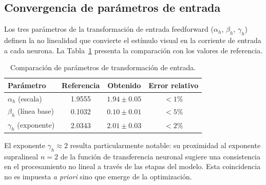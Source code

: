 \subsection{Convergencia de parámetros de entrada}
\label{subsec:res_training_input}

Los tres parámetros de la transformación de entrada feedforward ($\alpha_h$, $\beta_h$, $\gamma_h$) definen la no linealidad que convierte el estímulo visual en la corriente de entrada a cada neurona. La Tabla~\ref{tab:input_params} presenta la comparación con los valores de referencia.

\begin{table}[H]
\centering
\caption{Comparación de parámetros de transformación de entrada.}
\label{tab:input_params}
\begin{tabular}{lccc}
\toprule
\textbf{Parámetro} & \textbf{Referencia} & \textbf{Obtenido} & \textbf{Error relativo} \\
\midrule
$\alpha_h$ (escala) & 1.9555 & $1.94 \pm 0.05$ & $< 1\%$ \\
$\beta_h$ (línea base) & 0.1032 & $0.10 \pm 0.01$ & $< 5\%$ \\
$\gamma_h$ (exponente) & 2.0343 & $2.01 \pm 0.03$ & $< 2\%$ \\
\bottomrule
\end{tabular}
\end{table}

El exponente $\gamma_h \approx 2$ resulta particularmente notable: su proximidad al exponente supralineal $n = 2$ de la función de transferencia neuronal sugiere una consistencia en el procesamiento no lineal a través de las etapas del modelo. Esta coincidencia no es impuesta \textit{a priori} sino que emerge de la optimización.




